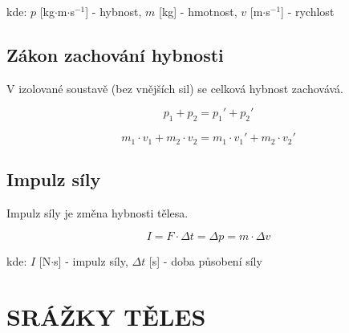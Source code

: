 \documentclass[a4paper,11pt]{article}
\begin{document}
\begin{notebox}
kde: $p$ [kg$\cdot$m$\cdot$s$^{-1}$] - hybnost, $m$ [kg] - hmotnost, $v$ [m$\cdot$s$^{-1}$] - rychlost
\end{notebox}

\subsection{Zákon zachování hybnosti}

\begin{definitionbox}
V izolované soustavě (bez vnějších sil) se celková hybnost zachovává.
\end{definitionbox}

\begin{equationbox}
\begin{equation*}
    p_1 + p_2 = p_1' + p_2'
\end{equation*}
\end{equationbox}

\begin{equationbox}
\begin{equation*}
    m_1 \cdot v_1 + m_2 \cdot v_2 = m_1 \cdot v_1' + m_2 \cdot v_2'
\end{equation*}
\end{equationbox}

\subsection{Impulz síly}

\begin{definitionbox}
Impulz síly je změna hybnosti tělesa.
\end{definitionbox}

\begin{equationbox}
\begin{equation*}
    I = F \cdot \Delta t = \Delta p = m \cdot \Delta v
\end{equation*}
\end{equationbox}

\begin{notebox}
kde: $I$ [N$\cdot$s] - impulz síly, $\Delta t$ [s] - doba působení síly
\end{notebox}

\newpage

\section{SRÁŽKY TĚLES}
\end{document}
